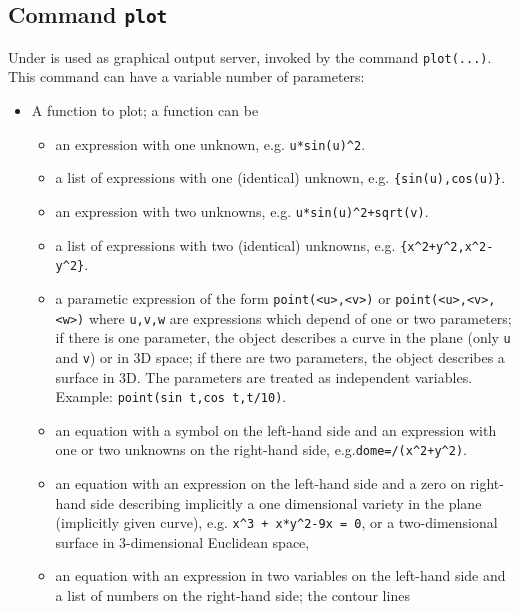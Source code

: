 \subsection{Command \texttt{plot}}

Under {\REDUCE} {\Gnuplot} is used as graphical output server, invoked by the
command \texttt{plot(...)}.  This command can have a variable number of
parameters:
\begin{itemize}
\item A function to plot; a function can be
  \begin{itemize}
    \item an expression with one unknown, e.g. \texttt{u*sin(u)\^{}2}.
    \item a list of expressions with one (identical) unknown,
      e.g. \texttt{\{sin(u),\allowbreak cos(u)\}}.
    \item an expression with two unknowns, e.g. \texttt{u*sin(u)\^{}2+sqrt(v)}.
    \item a list of expressions with two (identical) unknowns,
      e.g. \linebreak
      \texttt{\{x\textasciicircum{2}+y\textasciicircum{2},\allowbreak x\textasciicircum{2}-y\textasciicircum{2}\}}.
    \item a parametic expression of the form \texttt{point(<u>,<v>)} or
      \texttt{point(<u>,\allowbreak <v>,<w>)} where \texttt{u,v,w} are
      expressions which depend of one or two parameters; if there is one
      parameter, the object describes a curve in the plane (only \texttt{u} and
      \texttt{v}) or in 3D space; if there are two parameters, the object
      describes a surface in 3D. The parameters are treated as independent
      variables.  Example: \texttt{point(sin t,cos t,t/10)}.
    \item an equation with a symbol on the left-hand side and an expression with
      one or two unknowns on the right-hand side, e.g.\linebreak[3]
      \texttt{dome=/(x\^{}2+y\^{}2)}.
    \item an equation with an expression on the left-hand side and a zero on
      right-hand side describing implicitly a one dimensional variety in the
      plane (implicitly given curve), e.g.
      \texttt{x\^{}3 + x*y\^{}2-9x = 0}, or a
      two-dimensional surface in 3-dimensional Euclidean space,
    \item an equation with an expression in two variables on the left-hand side
      and a list of numbers on the right-hand side; the contour lines

\end{itemize}
\end{itemize}
